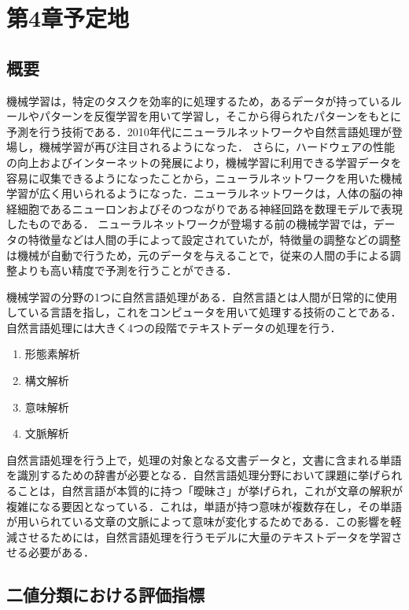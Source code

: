 \chapter{第4章予定地\label{c4}}

\section{概要\label{c4s1}}
機械学習は，特定のタスクを効率的に処理するため，あるデータが持っているルールやパターンを反復学習を用いて学習し，そこから得られたパターンをもとに予測を行う技術である．2010年代にニューラルネットワークや自然言語処理が登場し，機械学習が再び注目されるようになった．
さらに，ハードウェアの性能の向上およびインターネットの発展により，機械学習に利用できる学習データを容易に収集できるようになったことから，ニューラルネットワークを用いた機械学習が広く用いられるようになった．ニューラルネットワークは，人体の脳の神経細胞であるニューロンおよびそのつながりである神経回路を数理モデルで表現したものである．
ニューラルネットワークが登場する前の機械学習では，データの特徴量などは人間の手によって設定されていたが，特徴量の調整などの調整は機械が自動で行うため，元のデータを与えることで，従来の人間の手による調整よりも高い精度で予測を行うことができる．

機械学習の分野の1つに自然言語処理がある．自然言語とは人間が日常的に使用している言語を指し，これをコンピュータを用いて処理する技術のことである．自然言語処理には大きく4つの段階でテキストデータの処理を行う．

\begin{enumerate}
    \item 形態素解析
    \item 構文解析
    \item 意味解析
    \item 文脈解析
\end{enumerate}

自然言語処理を行う上で，処理の対象となる文書データと，文書に含まれる単語を識別するための辞書が必要となる．自然言語処理分野において課題に挙げられることは，自然言語が本質的に持つ「曖昧さ」が挙げられ，これが文章の解釈が複雑になる要因となっている．これは，単語が持つ意味が複数存在し，その単語が用いられている文章の文脈によって意味が変化するためである．この影響を軽減させるためには，自然言語処理を行うモデルに大量のテキストデータを学習させる必要がある．

\section{二値分類における評価指標 \label{c4s2}}

